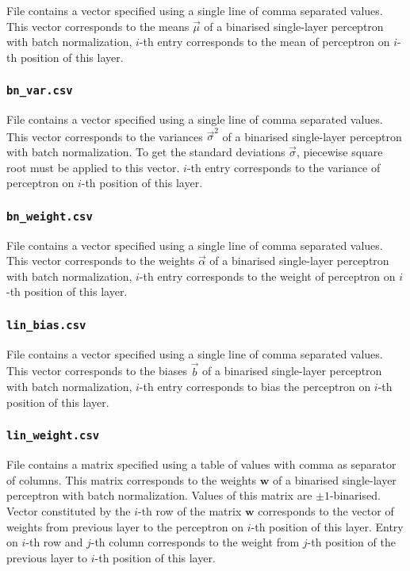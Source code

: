 File contains a vector specified using a single line of comma separated values.
This vector corresponds to the means $\vec \mu$ of a binarised single-layer
perceptron with batch normalization, $i$-th entry corresponds to the mean of perceptron on
$i$-th position of this layer.

\subsubsection{\texttt{bn\_var.csv}}

File contains a vector specified using a single line of comma separated values.
This vector corresponds to the variances $\vec \sigma^2$ of a binarised single-layer
perceptron with batch normalization. To get the standard deviations $\vec \sigma$,
piecewise square root must be applied to this vector. $i$-th entry corresponds to
the variance of perceptron on $i$-th position of this layer.

\subsubsection{\texttt{bn\_weight.csv}}

File contains a vector specified using a single line of comma separated values.
This vector corresponds to the weights $\vec \alpha$ of a binarised single-layer
perceptron with batch normalization, $i$-th entry corresponds to the weight of perceptron on
$i$-th position of this layer.

\subsubsection{\texttt{lin\_bias.csv}}

File contains a vector specified using a single line of comma separated values.
This vector corresponds to the biases $\vec b$ of a binarised single-layer
perceptron with batch normalization, $i$-th entry corresponds to bias the perceptron on
$i$-th position of this layer.

\subsubsection{\texttt{lin\_weight.csv}}

File contains a matrix specified using a table of values with comma as separator of columns.
This matrix corresponds to the weights $\mathbf{w}$ of a binarised single-layer
perceptron with batch normalization. Values of this matrix are $\pm 1$-binarised.
Vector constituted by the $i$-th row of the matrix $\mathbf{w}$ corresponds to
the vector of weights from previous layer to the perceptron on $i$-th position
of this layer.
Entry on $i$-th row and $j$-th column corresponds to the weight from $j$-th position
of the previous layer to $i$-th position of this layer.

